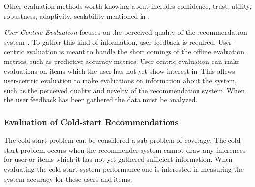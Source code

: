 Other evaluation methods worth knowing about includes confidence, trust,
utility, robustness, adaptivity, scalability mentioned in \cite{Herlocker2004,
Shani2011}.

\textit{User-Centric Evaluation} focuses on the perceived quality of the
recommendation system~\cite{Pu2011}.  To gather this kind of information, user
feedback is required.  User-centric evaluation is meant to handle the short
comings of the offline evaluation metrics, such as predictive accuracy metrics.
User-centric evaluation can make evaluations on items which the user has not
yet show interest in.  This allows user-centric evaluation to make evaluations
on information about the system, such as the perceived quality and novelty of
the recommendation system.  When the user feedback has been gathered the data
must be analyzed.

\subsubsection{Evaluation of Cold-start Recommendations}
\label{sec:cold-start-eval}

The cold-start problem can be considered a sub problem of coverage. The
cold-start problem occurs when the recommender system cannot draw any
inferences for user or items which it has not yet gathered sufficient
information. When evaluating the cold-start system performance one is
interested in measuring the system accuracy for these users and items.

